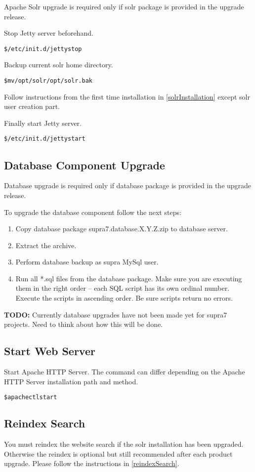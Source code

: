 \documentclass[12pt]{article}
\newcommand{\vigShowNotes}{1}
\newcommand{\vigPackageName}{supra7}
\newcommand{\vigReleaseVersion}{X.Y.Z}
\newcommand{\todo}[1]{
\textbf{TODO:} 
#1
}
\begin{document}
Apache Solr upgrade is required only if solr package is provided in the upgrade release.

Stop Jetty server beforehand.

\begin{alltt}
\$ /etc/init.d/jetty stop
\end{alltt}

Backup current solr home directory.

\begin{alltt}
\$ mv /opt/solr /opt/solr.bak
\end{alltt}

Follow instructions from the first time installation in \ref{solrInstallation} except \textsf{solr} user creation part.

Finally start Jetty server.

\begin{alltt}
\$ /etc/init.d/jetty start
\end{alltt}

\subsection{Database Component Upgrade}

Database upgrade is required only if database package is provided in the upgrade release.

To upgrade the database component follow the next steps:

\begin{enumerate}
	\item Copy database package {\vigPackageName}.database.\vigReleaseVersion.zip to database server.
	\item Extract the archive.
	\item Perform database backup as \textsf{supra} MySql user.
	\item Run all *.sql files from the database package. Make sure you are executing them in the right order -- each SQL script has its own ordinal number. Execute the scripts in ascending order. Be sure scripts return no errors.
\end{enumerate}

\todo{Currently database upgrades have not been made yet for supra7 projects. Need to think about how this will be done.}

\subsection{Start Web Server}
Start Apache HTTP Server. The command can differ depending on the Apache HTTP Server installation path and method.

\begin{alltt}
\$ apachectl start
\end{alltt}

\subsection{Reindex Search}

You must reindex the website search if the solr installation has been upgraded. Otherwise the reindex is optional but still recommended after each product upgrade. Please follow the instructions in \ref{reindexSearch}.
\end{document}
